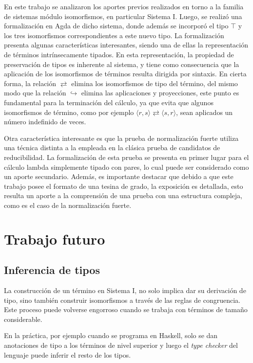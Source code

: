 En este trabajo se analizaron los aportes previos realizados en torno a la familia de sistemas módulo isomorfismos, en particular Sistema I.
Luego, se realizó una formalización en Agda de dicho sistema, donde además se incorporó el tipo $\top$ y los tres isomorfismos correspondientes a este nuevo tipo.
La formalización presenta algunas características interesantes, siendo una de ellas la representación de términos intrínsecamente tipados.
En esta representación, la propiedad de preservación de tipos es inherente al sistema, y tiene como consecuencia que la aplicación de los isomorfismos de términos resulta dirigida por sintaxis.
En cierta forma, la relación $\rightleftarrows$ elimina los isomorfismos de tipo del término, del mismo modo que la relación $\hookrightarrow$ elimina las aplicaciones y proyecciones, este punto es fundamental para la terminación del cálculo, ya que evita que algunos isomorfismos de término, como por ejemplo $\langle r,s \rangle\rightleftarrows\langle s,r \rangle$, sean aplicados un número indefinido de veces.

Otra característica interesante es que la prueba de normalización fuerte utiliza una técnica distinta a la empleada en la clásica prueba de candidatos de reducibilidad.
La formalización de esta prueba se presenta en primer lugar para el cálculo lambda simplemente tipado con pares, lo cual puede ser considerado como un aporte secundario.
Además, es importante destacar que debido a que este trabajo posee el formato de una tesina de grado, la exposición es detallada, esto resulta un aporte a la comprensión de una prueba con una estructura compleja, como es el caso de la normalización fuerte.

\section{Trabajo futuro}

\subsection{Inferencia de tipos}

La construcción de un término en Sistema I, no solo implica dar su derivación de tipo, sino también construir isomorfismos a través de las reglas de congruencia.
Este proceso puede volverse engorroso cuando se trabaja con términos de tamaño considerable.

En la práctica, por ejemplo cuando se programa en Haskell, solo se dan anotaciones de tipo a los términos de nivel superior y luego el \textit{type checker} del lenguaje puede inferir el resto de los tipos.

